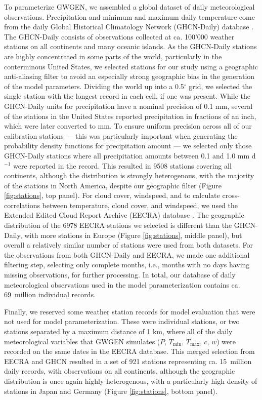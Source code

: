 \begin{refsection}
To parameterize GWGEN, we assembled a global dataset of daily meteorological observations. Precipitation and minimum and maximum daily temperature come from the daily Global Historical Climatology Network (GHCN-Daily) database \citep{MenneDurreVoseEtAl2012,Menne2012}. The GHCN-Daily consists of observations collected at ca. 100'000 weather stations on all continents and many oceanic islands. As the GHCN-Daily stations are highly concentrated in some parts of the world, particularly in the conterminous United States, we selected stations for our study using a geographic anti-aliasing filter to avoid an especially strong geographic bias in the generation of the model parameters. Dividing the world up into a 0.5$^{\circ}$ grid, we selected the single station with the longest record in each cell, if one was present. While the GHCN-Daily units for precipitation have a nominal precision of 0.1 mm, several of the stations in the United States reported  precipitation in fractions of an inch, which were later converted to mm. To ensure uniform precision across all of our calibration stations --- this was particularly important when generating the probability density functions for precipitation amount --- we selected only those GHCN-Daily stations where all precipitation amounts between 0.1 and 1.0 mm d$^{-1}$ were reported in the record. This resulted in 9508 stations covering all continents, although the distribution is strongly heterogenous, with the majority of the stations in North America, despite our geographic filter (Figure \ref{fig:stations}, top panel). For cloud cover, windspeed, and to calculate cross-correlations between temperature, cloud cover, and windspeed, we used the Extended Edited Cloud Report Archive (EECRA) database \citep{HahnWarren1999}. The geographic distribution of the 6978 EECRA stations we selected is different than the GHCN-Daily, with more stations in Europe (Figure \ref{fig:stations}, middle panel), but overall a relatively similar number of stations were used from both datasets. For the observations from both GHCN-Daily and EECRA, we made one additional filtering step, selecting only complete months, i.e., months with no days having missing observations, for further processing. In total, our database of daily meteorological observations used in the model parameterization contains ca. 69~million individual records.

Finally, we reserved some weather station records for model evaluation that were not used for model parameterization. These were individual stations, or two stations separated by a maximum distance of 1 km, where all of the daily meteorological variables that GWGEN simulates ($P,\,T_\mathrm{min},\,T_\mathrm{max},\, c,\,w$) were recorded on the same dates in the EECRA database. This merged selection from EECRA and GHCN resulted in a set of 921 stations representing ca. 15~million daily records, with observations on all continents, although the geographic distribution is once again highly heterogenous, with a particularly high density of stations in Japan and Germany (Figure \ref{fig:stations}, bottom panel).



\end{refsection}

